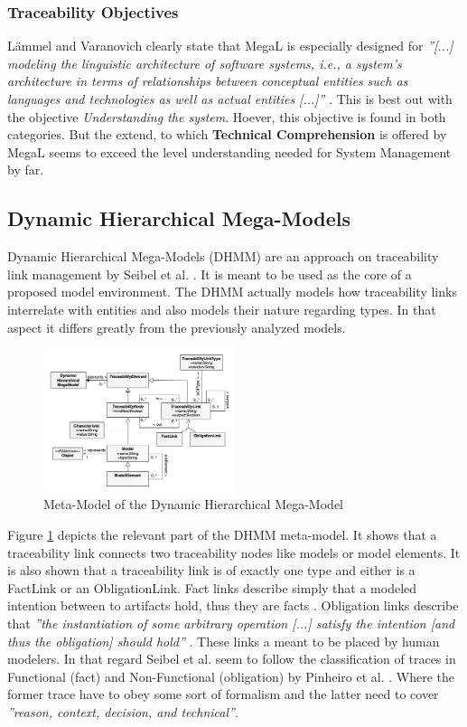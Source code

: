 \documentclass[runningheads,a4paper]{llncs}
\begin{document}
\subsubsection{Traceability Objectives}
Lämmel and Varanovich clearly state that MegaL is especially designed for \textit{''[...] modeling the linguistic architecture of software systems, i.e., a system’s architecture in terms of relationships between conceptual entities such as languages and technologies as well as actual entities [...]''} \cite{MEGAL2}.
This is best out with the objective \textit{Understanding the system}.
Hoever, this objective is found in both categories.
But the extend, to which \textbf{Technical Comprehension} is offered by MegaL seems to exceed the level understanding needed for System Management by far.


\subsection{Dynamic Hierarchical Mega-Models}
Dynamic Hierarchical Mega-Models (DHMM) are an approach on traceability link management by Seibel et al. \cite{DHMM}.
It is meant to be used as the core of a proposed model environment.
The DHMM actually models how traceability links interrelate with entities and also models their nature regarding types.
In that aspect it differs greatly from the previously analyzed models.

\begin{figure}
\centering
\includegraphics[width=0.5\textwidth]{dcmm.png}
\caption{Meta-Model of the Dynamic Hierarchical Mega-Model \cite{DHMM}}
\label{fig:DHMM-Meta-Model}
\end{figure}


Figure \ref{fig:DHMM-Meta-Model} depicts the relevant part of the DHMM meta-model.
It shows that a traceability link connects two traceability nodes like models or model elements.
It is also shown that a traceability link is of exactly one type and either is a FactLink or an ObligationLink.
Fact links describe simply that a modeled intention between to artifacts hold, thus they are facts \cite{DHMM}.
Obligation links describe that \textit{''the instantiation of some arbitrary operation [...] satisfy the intention [and thus the obligation] should hold''} \cite{DHMM}.
These links a meant to be placed by human modelers.
In that regard Seibel et al. seem to follow the classification of traces in Functional (fact) and Non-Functional (obligation) by Pinheiro et al. \cite{Pinheiro}.
Where the former trace have to obey some sort of formalism and the latter need to cover \textit{''reason, context, decision, and technical''}\cite{Pinheiro}.
\end{document}
